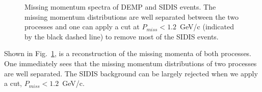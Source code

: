 \begin{figure}[!ht]
\begin{center}
\caption[Missing Momentum]{\footnotesize{Missing momentum spectra of DEMP
and SIDIS events. The missing momentum distributions are well separated between
the two processes and one can apply a cut at $P_{miss}<1.2$~GeV/c (indicated by the
black dashed line) to remove most of the SIDIS events.}}
  \label{missing_mom}
  \end{center}
\end{figure}

Shown in Fig.~\ref{missing_mom}, is a reconstruction of the missing momenta of
both processes. One immediately sees that the missing momentum distributions of
two processes are well separated. The SIDIS background can be largely rejected
when we apply a cut, $P_{miss}<1.2$~GeV/c.

